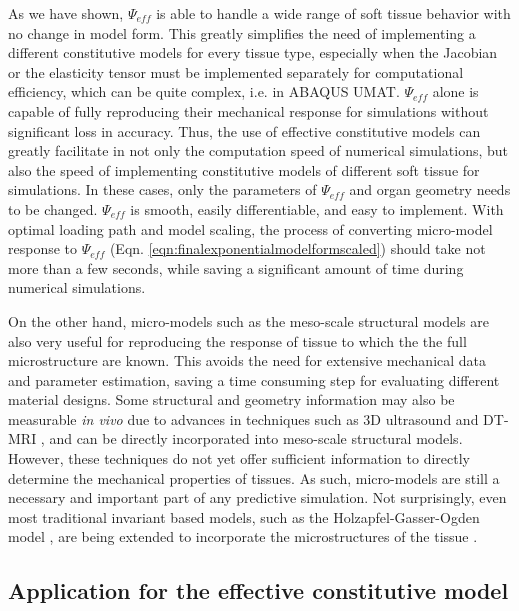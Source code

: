      As we have shown, $\Psi_{eff}$ is able to handle a wide range of soft tissue behavior with no change in model form. This greatly simplifies the need of implementing a different constitutive models for every tissue type, especially when the Jacobian or the elasticity tensor must be implemented separately for computational efficiency, which can be quite complex, i.e. in ABAQUS UMAT. $\Psi_{eff}$ alone is capable of fully reproducing their mechanical response for simulations without significant loss in accuracy. Thus, the use of effective constitutive models can greatly facilitate in not only the computation speed of numerical simulations, but also the speed of implementing constitutive models of different soft tissue for simulations. In these cases, only the parameters of $\Psi_{eff}$ and organ geometry needs to be changed. $\Psi_{eff}$ is smooth, easily differentiable, and easy to implement. With optimal loading path and model scaling, the process of converting micro-model response to $\Psi_{eff}$ (Eqn. \ref{eqn:finalexponentialmodelformscaled}) should take not more than a few seconds, while saving a significant amount of time during numerical simulations. 
     
     On the other hand, micro-models such as the meso-scale structural models are also very useful for reproducing the response of tissue to which the the full microstructure are known. This avoids the need for extensive mechanical data and parameter estimation, saving a time consuming step for evaluating different material designs. Some structural and geometry information may also be measurable \textit{in vivo} due to advances in techniques such as 3D ultrasound \cite{steiner_diagnostic_1994, yang_3d_2008, fenster_3_1996} and DT-MRI \cite{basser_vivo_2000, basser_microstructural_2011}, and can be directly incorporated into meso-scale structural models. However, these techniques do not yet offer sufficient information to directly determine the mechanical properties of tissues. As such, micro-models are still a necessary and important part of any predictive simulation. Not surprisingly, even most traditional invariant based models, such as the Holzapfel-Gasser-Ogden model \cite{holzapfel_new_2000}, are being extended to incorporate the microstructures of the tissue \cite{holzapfel_modelling_2015}. 
    
    


\subsection{Application for the effective constitutive model}
    
